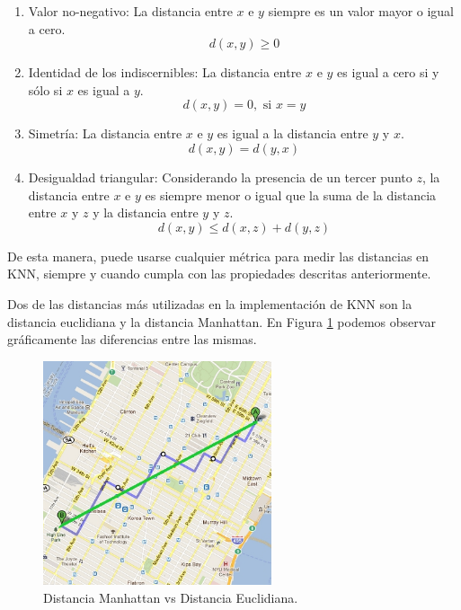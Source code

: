 \documentclass[12pt,a4paper]{article}
\begin{document}
\begin{sloppypar}
\begin{enumerate}
\item Valor no-negativo: La distancia entre $x$ e $y$ siempre es un valor mayor o igual a cero. 
$$d(x,y) \geq 0$$

\item Identidad de los indiscernibles: La distancia entre $x$ e $y$ es igual a cero si y sólo si $x$ es igual a $y$.
\[d(x,y) = 0, \text{   si  } x=y\]

\item Simetría:  La distancia entre $x$ e $y$ es igual a la distancia entre $y$ y $x$.
$$d(x,y) = d(y,x)$$

\item Desigualdad triangular: Considerando la presencia de un tercer punto $z$, la distancia entre $x$ e $y$ es siempre menor o igual que la suma de la distancia entre $x$ y $z$ y la distancia entre $y$ y $z$. 
$$d(x,y) \leq d(x,z) + d(y,z)$$
\end{enumerate}

De esta manera, puede usarse cualquier métrica para medir las distancias en KNN, siempre y cuando cumpla con las propiedades descritas anteriormente.

Dos de las distancias más utilizadas en la implementación de KNN son la distancia euclidiana y la distancia Manhattan. En  Figura \ref{fig:Man_euc} podemos observar gráficamente las diferencias entre las mismas.

\begin{figure}[H]    %
 \centering
 \includegraphics[width=0.6\textwidth]{images/Manhattan_Euclidiana.png}
 \captionsetup{justification=centering,margin=2cm}
 \caption{Distancia Manhattan vs Distancia Euclidiana\cite{apunte_uba}.} 
 \label{fig:Man_euc}
\end{figure}


\end{sloppypar}
\end{document}
